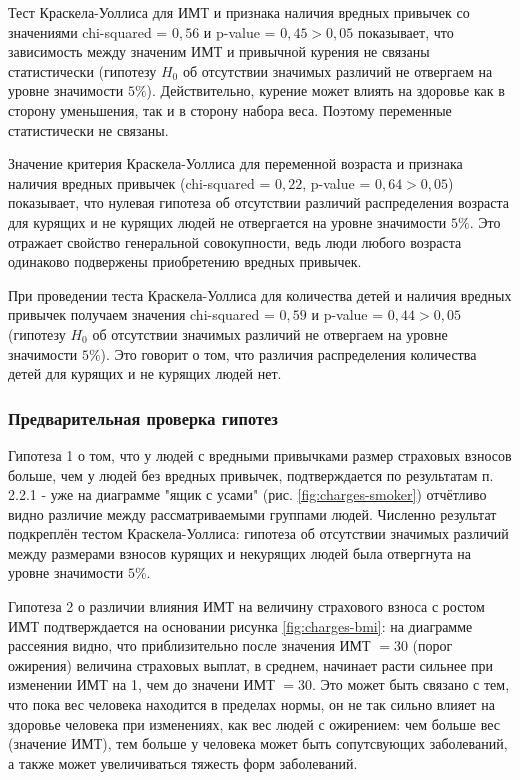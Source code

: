 \documentclass[a4paper,12pt]{article}
\begin{document}
Тест Краскела-Уоллиса для ИМТ и признака наличия вредных привычек со значениями chi-squared = $0,56$ и p-value = $0,45 > 0,05$ показывает, что зависимость между значеним ИМТ и привычной курения не связаны статистически (гипотезу $H_0$ об отсутствии значимых различий не отвергаем на уровне значимости $5\%$). Действительно, курение может влиять на здоровье как в сторону уменьшения, так и в сторону набора веса. Поэтому переменные статистически не связаны.

Значение критерия Краскела-Уоллиса для переменной возраста и признака наличия вредных привычек (chi-squared = $0,22$, p-value = $0,64 > 0,05$) показывает, что нулевая гипотеза об отсутствии различий распределения возраста для курящих и не курящих людей не отвергается на уровне значимости $5\%$. Это отражает свойство генеральной совокупности, ведь люди любого возраста одинаково подвержены приобретению вредных привычек.

При проведении теста Краскела-Уоллиса для количества детей и наличия вредных привычек получаем значения chi-squared = $0,59$ и p-value = $0,44 > 0,05$ (гипотезу $H_0$ об отсутствии значимых различий не отвергаем на уровне значимости $5\%$). Это говорит о том, что различия распределения количества детей для курящих и не курящих людей нет.

\subsubsection{Предварительная проверка гипотез}

Гипотеза 1 о том, что у людей с вредными привычками размер страховых взносов больше, чем у людей без вредных привычек, подтверждается по результатам п. 2.2.1 - уже на диаграмме "ящик с усами" (рис. \ref{fig:charges-smoker}) отчётливо видно различие между рассматриваемыми группами людей. Численно результат подкреплён тестом Краскела-Уоллиса: гипотеза об отсутствии значимых различий между размерами взносов курящих и некурящих людей была отвергнута на уровне значимости $5\%$.

Гипотеза 2 о различии влияния ИМТ на величину страхового взноса с ростом ИМТ подтверждается на основании рисунка \ref{fig:charges-bmi}: на диаграмме рассеяния видно, что приблизительно после значения ИМТ $= 30$ (порог ожирения) величина страховых выплат, в среднем, начинает расти сильнее при изменении ИМТ на 1, чем до значени ИМТ $= 30$. Это может быть связано с тем, что пока вес человека находится в пределах нормы, он не так сильно влияет на здоровье человека при изменениях, как вес людей с ожирением: чем больше вес (значение ИМТ), тем больше у человека может быть сопутсвующих заболеваний, а также может увеличиваться тяжесть форм заболеваний.
\end{document}
